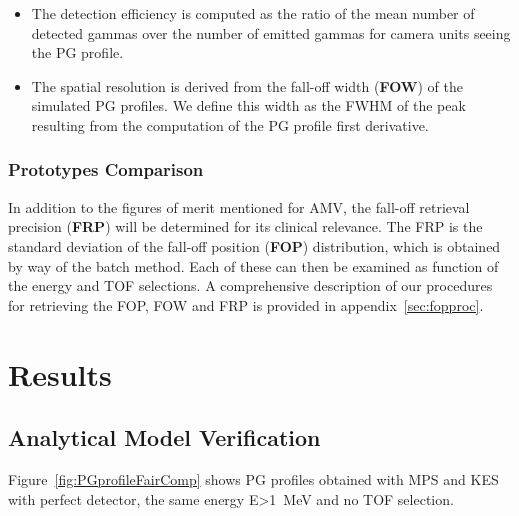 \documentclass[a4paper,english,12pt]{article}
\begin{document}
\begin{itemize}
	\item The detection efficiency is computed as the ratio of the mean number of detected gammas over the number of emitted gammas for camera units seeing the PG profile.
	\item The spatial resolution is derived from the fall-off width (\textbf{FOW}) of the simulated PG profiles. We define this width as the FWHM of the peak resulting from the computation of the PG profile first derivative.
\end{itemize}
\subsubsection{Prototypes Comparison}

In addition to the figures of merit mentioned for AMV, the fall-off retrieval precision (\textbf{FRP}) will be determined for its clinical relevance. The FRP is the standard deviation of the fall-off position (\textbf{FOP}) distribution, which is obtained by way of the batch method. Each of these can then be examined as function of the energy and TOF selections. A comprehensive description of our procedures for retrieving the FOP, FOW and FRP is provided in appendix~\ref{sec:fopproc}.

\section{Results}

\subsection{Analytical Model Verification}

Figure~\ref{fig:PGprofileFairComp} shows PG profiles obtained with MPS and KES with perfect detector, the same energy E>1~MeV and no TOF selection.
\end{document}
